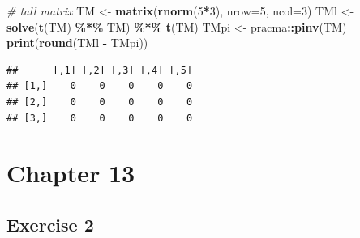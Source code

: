 \documentclass[
]{book}
\newenvironment{Shaded}{\begin{snugshade}}{\end{snugshade}}
\newcommand{\CommentTok}[1]{\textcolor[rgb]{0.56,0.35,0.01}{\textit{#1}}}
\newcommand{\DataTypeTok}[1]{\textcolor[rgb]{0.13,0.29,0.53}{#1}}
\newcommand{\DecValTok}[1]{\textcolor[rgb]{0.00,0.00,0.81}{#1}}
\newcommand{\KeywordTok}[1]{\textcolor[rgb]{0.13,0.29,0.53}{\textbf{#1}}}
\newcommand{\NormalTok}[1]{#1}
\newcommand{\OperatorTok}[1]{\textcolor[rgb]{0.81,0.36,0.00}{\textbf{#1}}}
\newcommand{\StringTok}[1]{\textcolor[rgb]{0.31,0.60,0.02}{#1}}
\begin{document}
\begin{Shaded}
\begin{Highlighting}[]
\CommentTok{\# tall matrix}
\NormalTok{TM \textless{}{-}}\StringTok{ }\KeywordTok{matrix}\NormalTok{(}\KeywordTok{rnorm}\NormalTok{(}\DecValTok{5}\OperatorTok{*}\DecValTok{3}\NormalTok{), }\DataTypeTok{nrow=}\DecValTok{5}\NormalTok{, }\DataTypeTok{ncol=}\DecValTok{3}\NormalTok{)}
\NormalTok{TMl \textless{}{-}}\StringTok{ }\KeywordTok{solve}\NormalTok{(}\KeywordTok{t}\NormalTok{(TM) }\OperatorTok{\%*\%}\StringTok{ }\NormalTok{TM) }\OperatorTok{\%*\%}\StringTok{ }\KeywordTok{t}\NormalTok{(TM)}
\NormalTok{TMpi \textless{}{-}}\StringTok{ }\NormalTok{pracma}\OperatorTok{::}\KeywordTok{pinv}\NormalTok{(TM)}
\KeywordTok{print}\NormalTok{(}\KeywordTok{round}\NormalTok{(TMl }\OperatorTok{{-}}\StringTok{ }\NormalTok{TMpi))}
\end{Highlighting}
\end{Shaded}

\begin{verbatim}
##      [,1] [,2] [,3] [,4] [,5]
## [1,]    0    0    0    0    0
## [2,]    0    0    0    0    0
## [3,]    0    0    0    0    0
\end{verbatim}

\hypertarget{chapter-13-1}{%
\section*{Chapter 13}\label{chapter-13-1}}

\hypertarget{exercise-2-9}{%
\subsection*{Exercise 2}\label{exercise-2-9}}
\end{document}
